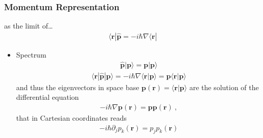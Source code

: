 \documentclass[letterpaper,10pt,english]{jupyterBook}
\begin{document}
\subsubsection{Momentum Representation}
\label{\detokenize{ch/quantum-mechanics/intro:momentum-representation}}\label{\detokenize{ch/quantum-mechanics/intro:quantum-mechanics-intro-non-relativistic-basis-momentum}}
\sphinxAtStartPar
{} as the limit of… 
\begin{equation}\label{equation:ch/quantum-mechanics/intro:eq:qm:momentum-operator}
\begin{split}\langle \mathbf{r} | \hat{\mathbf{p}} = - i \hbar \nabla \langle \mathbf{r} | \end{split}
\end{equation}\begin{itemize}
\item {} 
\sphinxAtStartPar
Spectrum
\begin{equation*}
\begin{split}\hat{\mathbf{p}} | \mathbf{p} \rangle = \mathbf{p} | \mathbf{p} \rangle\end{split}
\end{equation*}\begin{equation*}
\begin{split}\langle \mathbf{r} | \hat{\mathbf{p}} | \mathbf{p} \rangle = - i \hbar \nabla \langle \mathbf{r} | \mathbf{p} \rangle = \mathbf{p} \langle \mathbf{r} | \mathbf{p} \rangle\end{split}
\end{equation*}
\sphinxAtStartPar
and thus the eigenvectors in space base \(\mathbf{p}(\mathbf{r}) = \langle \mathbf{r} | \mathbf{p} \rangle\) are the solution of the differential equation
\begin{equation*}
\begin{split}- i \hbar \nabla \mathbf{p}(\mathbf{r}) = \mathbf{p} \mathbf{p}(\mathbf{r}) \ ,\end{split}
\end{equation*}
\sphinxAtStartPar
that in Cartesian coordinates reads
\begin{equation*}
\begin{split}- i \hbar \partial_j p_k(\mathbf{r}) = p_j p_k(\mathbf{r})\end{split}
\end{equation*}\begin{equation*}

\end{equation*}
\end{itemize}
\end{document}
